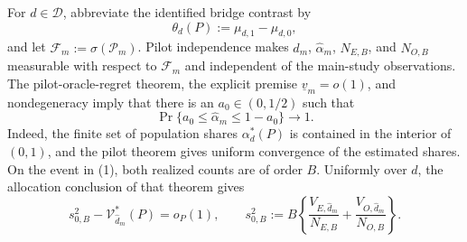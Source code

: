 For \(d\in\mathcal D\), abbreviate the identified bridge contrast by
\[
 \theta_d(P):=\mu_{d,1}-\mu_{d,0},
\]
and let \(\mathcal F_m:=\sigma(\mathcal P_m)\).  Pilot independence makes \(\widehat d_m\), \(\widehat\alpha_m\), \(N_{E,B}\), and \(N_{O,B}\) measurable with respect to \(\mathcal F_m\) and independent of the main-study observations.  The pilot-oracle-regret theorem, the explicit premise \(\underline v_m=o(1)\), and nondegeneracy imply that there is an \(a_0\in(0,1/2)\) such that
\[
 \Pr\{a_0\le\widehat\alpha_m\le1-a_0\}\longrightarrow1.                \tag{1}
\]
Indeed, the finite set of population shares \(\alpha_d^*(P)\) is contained in the interior of \((0,1)\), and the pilot theorem gives uniform convergence of the estimated shares.  On the event in (1), both realized counts are of order \(B\).  Uniformly over \(d\), the allocation conclusion of that theorem gives
\[
 s_{0,B}^2-\mathcal V_{\widehat d_m}^*(P)=o_P(1),
 \qquad
 s_{0,B}^2:=B\left\{
 \frac{V_{E,\widehat d_m}}{N_{E,B}}
 +\frac{V_{O,\widehat d_m}}{N_{O,B}}
 \right\}.                                                               \tag{2}
\]

